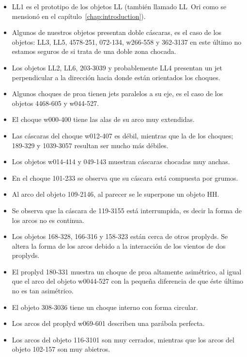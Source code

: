 \begin{itemize}
\item LL1 es el prototipo de los objetos LL  (también llamado LL~Ori como se mensionó en el capítulo~\ref{chap:introduction}).
\item Algunos de nuestros objetos presentan doble cáscaras, es el caso de los objetos: LL3, LL5, 4578-251, 072-134, w266-558 y 362-3137 en este último no estamos seguros de si trata de una doble zona chocada.  
\item Los objetos LL2, LL6, 203-3039 y probablemente LL4 presentan un jet perpendicular a la dirección hacia donde están orientados los choques.
\item Algunos choques de proa tienen jets paralelos a su eje, es el caso de los objetos 4468-605 y w044-527.
\item El choque w000-400 tiene las alas de su arco muy extendidas.
\item Las cáscaras del choque w012-407 es débil, mientras que la de los choques; 189-329 y 1039-3057 resultan ser mucho más débiles.
\item Los objetos w014-414 y 049-143 muestran cáscaras chocadas muy anchas.
\item En el choque 101-233 se observa que su cáscara está compuesta por grumos.
\item Al arco del objeto 109-2146, al parecer se le superpone un objeto HH.
\item Se observa que la cáscara de 119-3155 está interrumpida, es decir la forma de los arcos no es continua.
\item Los objetos 168-328, 166-316 y 158-323 están cerca de otros proplyds. Se altera la forma de los arcos debido a la interacción de los vientos de dos proplyds.  
\item El proplyd 180-331 muestra un choque de proa altamente asimétrico, al igual que el arco del objeto w0044-527 con la pequeña  diferencia de que éste último no es tan asimétrico.
\item El objeto 308-3036 tiene un choque interno con forma circular.
\item Los arcos del proplyd w069-601 describen una parábola perfecta.
\item Los arcos del objeto 116-3101 son muy cerrados, mientras que los arcos del objeto 102-157 son muy abietros.

\end{itemize}


\setlength{\fboxsep}{0pt}%

\newlength\figwidth
\setlength{}


